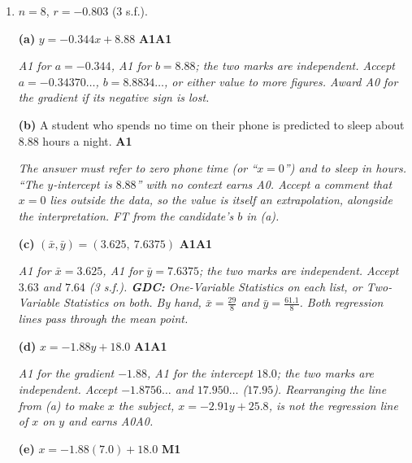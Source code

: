 \documentclass[12pt, twoside]{article}
\begin{document}
\begin{enumerate}[itemsep=0.3cm]
\emph{R1 for stating that $10$ lies outside the data range (or ``below the
lowest temperature recorded''). Accept ``extrapolation'' with a reference to
the data. ``The correlation might not hold in winter'' with no reference to
the range of the data earns R0. Computing $y = 81.8$ is not required and
earns nothing on its own.}

\newpage

\item[2.] [Maximum mark: 9]

$n = 8$, \quad $r = -0.803$ (3 s.f.).

\textbf{(a)} $y = -0.344x + 8.88$ \hfill \textbf{A1A1}

\emph{A1 for $a = -0.344$, A1 for $b = 8.88$; the two marks are independent.
Accept $a = -0.34370\ldots$, $b = 8.8834\ldots$, or either value to more
figures. Award A0 for the gradient if its negative sign is lost.}

\textbf{(b)} A student who spends no time on their phone is predicted to sleep
about $8.88$ hours a night. \hfill \textbf{A1}

\emph{The answer must refer to zero phone time (or ``$x = 0$'') and to sleep
in hours. ``The $y$-intercept is $8.88$'' with no context earns A0. Accept a
comment that $x = 0$ lies outside the data, so the value is itself an
extrapolation, alongside the interpretation. FT from the candidate's $b$ in
(a).}

\textbf{(c)} $(\bar{x}, \bar{y}) = (3.625,\ 7.6375)$ \hfill \textbf{A1A1}

\emph{A1 for $\bar{x} = 3.625$, A1 for $\bar{y} = 7.6375$; the two marks are
independent. Accept $3.63$ and $7.64$ (3 s.f.). \textbf{GDC:} One-Variable
Statistics on each list, or Two-Variable Statistics on both. By hand,
$\bar{x} = \frac{29}{8}$ and $\bar{y} = \frac{61.1}{8}$. Both regression
lines pass through the mean point.}

\textbf{(d)} $x = -1.88y + 18.0$ \hfill \textbf{A1A1}

\emph{A1 for the gradient $-1.88$, A1 for the intercept $18.0$; the two
marks are independent. Accept $-1.8756\ldots$ and $17.950\ldots$ ($17.95$).
Rearranging the line from (a) to make $x$ the subject,
$x = -2.91y + 25.8$, is not the regression line of $x$ on $y$ and earns
A0A0.}

\textbf{(e)} $x = -1.88(7.0) + 18.0$ \hfill \textbf{M1}


\end{enumerate}
\end{document}
